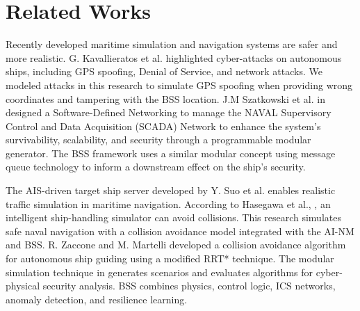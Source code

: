 \documentclass[conference]{IEEEtran}
\begin{document}
\section{Related Works}
Recently developed maritime simulation and navigation systems are safer and more realistic. G. Kavallieratos et al. \cite{b8} highlighted cyber-attacks on autonomous ships, including GPS spoofing, Denial of Service, and network attacks. We modeled attacks in this research to simulate GPS spoofing when providing wrong coordinates and tampering with the BSS location. J.M Szatkowski et al. in \cite{b11} designed a Software-Defined Networking to manage the NAVAL Supervisory Control and Data Acquisition (SCADA) Network to enhance the system's survivability, scalability, and security through a programmable modular generator.  The BSS framework uses a similar modular concept using message queue technology to inform a downstream effect on the ship's security.

The AIS-driven target ship server developed by Y. Suo et al. \cite{b7} enables realistic traffic simulation in maritime navigation. According to Hasegawa et al., \cite{b9}, an intelligent ship-handling simulator can avoid collisions. This research simulates safe naval navigation with a collision avoidance model integrated with the AI-NM and BSS. 
R. Zaccone and M. Martelli \cite{b10} developed a collision avoidance algorithm for autonomous ship guiding using a modified RRT* technique. The modular simulation technique in \cite{b6} generates scenarios and evaluates algorithms for cyber-physical security analysis. BSS combines physics, control logic, ICS networks, anomaly detection, and resilience learning.

\end{document}

